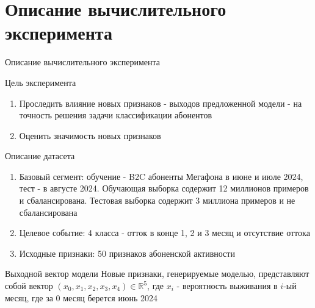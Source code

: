 \documentclass[10pt,pdf,hyperref={unicode}]{beamer}
\begin{document}
\section{Описание вычислительного эксперимента}
\begin{frame}{Описание вычислительного эксперимента}
	
	\begin{block}{Цель эксперимента}
	\begin{enumerate}[1)]
	\item Проследить влияние новых признаков - выходов предложенной модели - на точность решения задачи классификации абонентов
	\item Оценить значимость новых признаков
\end{enumerate}		
		
		
	\end{block}
	
	
	\begin{block}{Описание датасета}
	\begin{enumerate}[1)]
		\item Базовый сегмент: обучение - B2C абоненты Мегафона в июне и июле 2024, тест - в августе 2024. Обучающая выборка содержит 12 миллионов примеров и сбалансирована. Тестовая выборка содержит 3 миллиона примеров и не сбалансирована
		\item Целевое событие: 4 класса - отток в конце 1, 2 и 3 месяц и отсутствие оттока
		\item Исходные признаки: 50 признаков абоненской активности
	\end{enumerate}
	\end{block}
	
		\begin{block}{Выходной вектор модели}
	Новые признаки, генерируемые моделью, представляют собой вектор $(x_0,x_1,x_2,x_3,x_4) \in \mathbb{R}^{5}$, где $x_i$ - вероятность выживания в $i$-ый месяц, где за $0$ месяц берется июнь 2024
	\end{block}
	
\end{frame}


\end{document}
